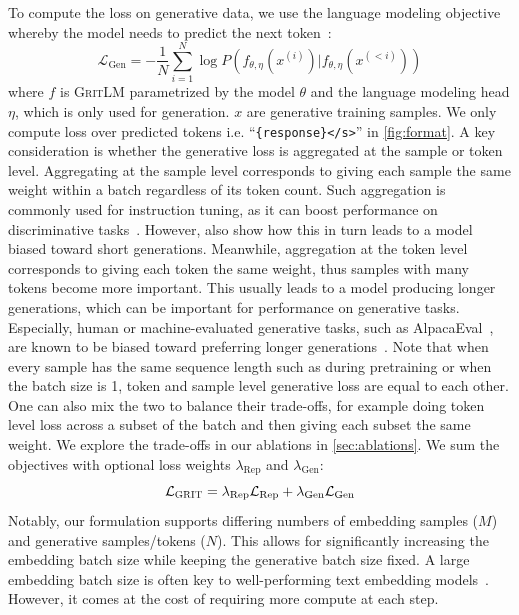 \documentclass{article}
\newcommand{\model}{\textsc{GritLM}}
\newcommand{\method}{\textsc{GRIT}}
\begin{document}
To compute the loss on generative data, we use the language modeling objective whereby the model needs to predict the next token~\cite{radford2018improving,radford2019language}:
\begin{equation}\label{eq:gen}
\mathcal{L}_{\text{Gen}} = -\frac{1}{N}\sum_{i=1}^{N} \log P(f_{\theta, \eta}(x^{(i)}) | f_{\theta, \eta}(x^{(<i)}))
\end{equation}
where $f$ is \model{} parametrized by the model $\theta$ and the language modeling head $\eta$, which is only used for generation. $x$ are generative training samples. We only compute loss over predicted tokens i.e. ``\verb|{response}</s>|'' in \autoref{fig:format}. A key consideration is whether the generative loss is aggregated at the sample or token level. Aggregating at the sample level corresponds to giving each sample the same weight within a batch regardless of its token count. Such aggregation is commonly used for instruction tuning, as it can boost performance on discriminative tasks~\cite{muennighoff2023crosslingual}. However, \citet{muennighoff2023crosslingual} also show how this in turn leads to a model biased toward short generations. Meanwhile, aggregation at the token level corresponds to giving each token the same weight, thus samples with many tokens become more important. This usually leads to a model producing longer generations, which can be important for performance on generative tasks. Especially, human or machine-evaluated generative tasks, such as AlpacaEval~\cite{alpaca_eval}, are known to be biased toward preferring longer generations~\cite{wang2023far}. Note that when every sample has the same sequence length such as during pretraining or when the batch size is 1, token and sample level generative loss are equal to each other. One can also mix the two to balance their trade-offs, for example doing token level loss across a subset of the batch and then giving each subset the same weight. We explore the trade-offs in our ablations in \autoref{sec:ablations}. We sum the objectives with optional loss weights $\lambda_{\text{Rep}}$ and $\lambda_{\text{Gen}}$:
\begin{equation}\label{eq:grit}
\mathcal{L}_{\method{}} = \lambda_{\text{Rep}}\mathcal{L}_{\text{Rep}} + \lambda_{\text{Gen}}\mathcal{L}_{\text{Gen}}
\end{equation}
Notably, our formulation supports differing numbers of embedding samples ($M$) and generative samples/tokens ($N$). This allows for significantly increasing the embedding batch size while keeping the generative batch size fixed. A large embedding batch size is often key to well-performing text embedding models~\cite{xiao2023cpack}. However, it comes at the cost of requiring more compute at each step.
\end{document}
